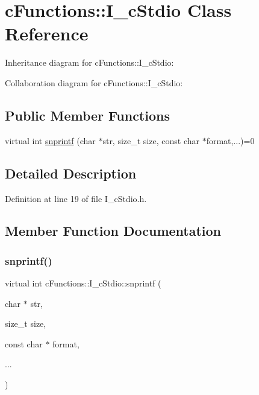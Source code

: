 \hypertarget{classcFunctions_1_1I__cStdio}{}\section{c\+Functions\+::I\+\_\+c\+Stdio Class Reference}
\label{classcFunctions_1_1I__cStdio}


Inheritance diagram for c\+Functions\+::I\+\_\+c\+Stdio\+:


Collaboration diagram for c\+Functions\+::I\+\_\+c\+Stdio\+:
\subsection*{Public Member Functions}
\begin{DoxyCompactItemize}
\item 
virtual int \mbox{\hyperlink{classcFunctions_1_1I__cStdio_a1f0f3e02f8818ec070705d7195f1f517}{snprintf}} (char $\ast$str, size\+\_\+t size, const char $\ast$format,...)=0
\end{DoxyCompactItemize}


\subsection{Detailed Description}


Definition at line 19 of file I\+\_\+c\+Stdio.\+h.



\subsection{Member Function Documentation}
\mbox{\label{classcFunctions_1_1I__cStdio_a1f0f3e02f8818ec070705d7195f1f517}} 
\subsubsection{\texorpdfstring{snprintf()}{snprintf()}}
{\footnotesize\ttfamily virtual int c\+Functions\+::\+I\+\_\+c\+Stdio\+::snprintf (\begin{DoxyParamCaption}\item[{char $\ast$}]{str,  }\item[{size\+\_\+t}]{size,  }\item[{const char $\ast$}]{format,  }\item[{}]{... }\end{DoxyParamCaption})\hspace{0.3cm}{\ttfamily [pure virtual]}}

